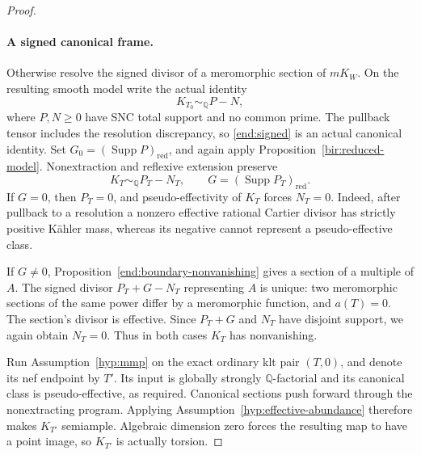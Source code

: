 \documentclass[11pt,letterpaper]{article}
\theoremstyle{definition}
\theoremstyle{remark}
\begin{document}
\begin{proof}
\paragraph{A signed canonical frame.}
Otherwise resolve the signed divisor of a meromorphic section of
\(mK_W\). On the resulting smooth model write the actual identity
\begin{equation}\label{end:signed}
 K_{T_0}\sim_{\mathbb{Q}}P-N,
\end{equation}
where \(P,N\ge0\) have SNC total support and no common prime.
The pullback tensor includes the resolution discrepancy, so
\eqref{end:signed} is an actual canonical identity. Set
\(G_0=(\operatorname{Supp} P)_{\mathrm{red}}\), and again apply
Proposition~\ref{bir:reduced-model}. Nonextraction and reflexive
extension preserve
\[
 K_T\sim_{\mathbb{Q}}P_T-N_T,
 \qquad G=(\operatorname{Supp} P_T)_{\mathrm{red}}.
\]
If \(G=0\), then \(P_T=0\), and pseudo-effectivity of \(K_T\)
forces \(N_T=0\). Indeed, after pullback to a resolution a
nonzero effective rational Cartier divisor has strictly positive
K\"ahler mass, whereas its negative cannot represent a
pseudo-effective class.

If \(G\ne0\), Proposition~\ref{end:boundary-nonvanishing}
gives a section of a multiple of \(A\). The signed divisor
\(P_T+G-N_T\) representing \(A\) is unique: two meromorphic
sections of the same power differ by a meromorphic function, and
\(a(T)=0\). The section's divisor is effective. Since \(P_T+G\)
and \(N_T\) have disjoint support, we again obtain \(N_T=0\).
Thus in both cases \(K_T\) has nonvanishing.

Run Assumption~\ref{hyp:mmp} on the exact ordinary klt pair
\((T,0)\), and denote its nef endpoint by \(T'\). Its input
is globally strongly \(\mathbb{Q}\)-factorial and its canonical class
is pseudo-effective, as required. Canonical sections push forward
through the nonextracting program. Applying
Assumption~\ref{hyp:effective-abundance} therefore makes
\(K_{T'}\) semiample. Algebraic dimension zero forces the resulting
map to have a point image, so \(K_{T'}\) is actually torsion.


\end{proof}
\end{document}
